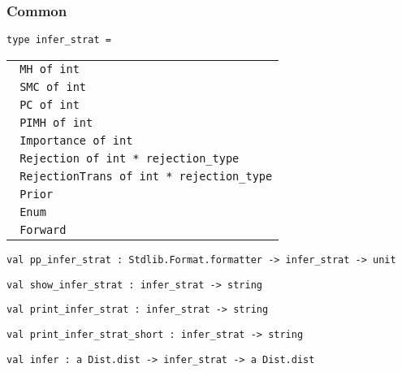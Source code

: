 \hypertarget{com}{\subsubsection{\texorpdfstring{\protect\hyperlink{com}{}Common}{Common}}\label{com}}

\protect\hyperlink{type-inferux5fstrat}{}\texttt{type\ infer\_strat}\texttt{\ =\ }

\begin{longtable}[c]{@{}l@{}}
\toprule
\protect\hyperlink{type-inferux5fstrat.MH}{}\texttt{\textbar{}\ }\texttt{MH\ of\ int}\tabularnewline
\protect\hyperlink{type-inferux5fstrat.SMC}{}\texttt{\textbar{}\ }\texttt{SMC\ of\ int}\tabularnewline
\protect\hyperlink{type-inferux5fstrat.PC}{}\texttt{\textbar{}\ }\texttt{PC\ of\ int}\tabularnewline
\protect\hyperlink{type-inferux5fstrat.PIMH}{}\texttt{\textbar{}\ }\texttt{PIMH\ of\ int}\tabularnewline
\protect\hyperlink{type-inferux5fstrat.Importance}{}\texttt{\textbar{}\ }\texttt{Importance\ of\ int}\tabularnewline
\protect\hyperlink{type-inferux5fstrat.Rejection}{}\texttt{\textbar{}\ }\texttt{Rejection\ of\ int\ *\ rejection\_type}\tabularnewline
\protect\hyperlink{type-inferux5fstrat.RejectionTrans}{}\texttt{\textbar{}\ }\texttt{RejectionTrans\ of\ int\ *\ rejection\_type}\tabularnewline
\protect\hyperlink{type-inferux5fstrat.Prior}{}\texttt{\textbar{}\ }\texttt{Prior}\tabularnewline
\protect\hyperlink{type-inferux5fstrat.Enum}{}\texttt{\textbar{}\ }\texttt{Enum}\tabularnewline
\protect\hyperlink{type-inferux5fstrat.Forward}{}\texttt{\textbar{}\ }\texttt{Forward}\tabularnewline
\bottomrule
\end{longtable}

\protect\hyperlink{val-ppux5finferux5fstrat}{}\texttt{val\ pp\_infer\_strat\ :\ Stdlib.Format.formatter\ -\textgreater{}\ infer\_strat\ -\textgreater{}\ unit}

\protect\hyperlink{val-showux5finferux5fstrat}{}\texttt{val\ show\_infer\_strat\ :\ infer\_strat\ -\textgreater{}\ string}

\protect\hyperlink{val-printux5finferux5fstrat}{}\texttt{val\ print\_infer\_strat\ :\ infer\_strat\ -\textgreater{}\ string}

\protect\hyperlink{val-printux5finferux5fstratux5fshort}{}\texttt{val\ print\_infer\_strat\_short\ :\ infer\_strat\ -\textgreater{}\ string}

\protect\hyperlink{val-infer}{}\texttt{val\ infer\ :\ \textquotesingle{}a\ Dist.dist\ -\textgreater{}\ infer\_strat\ -\textgreater{}\ \textquotesingle{}a\ Dist.dist}

